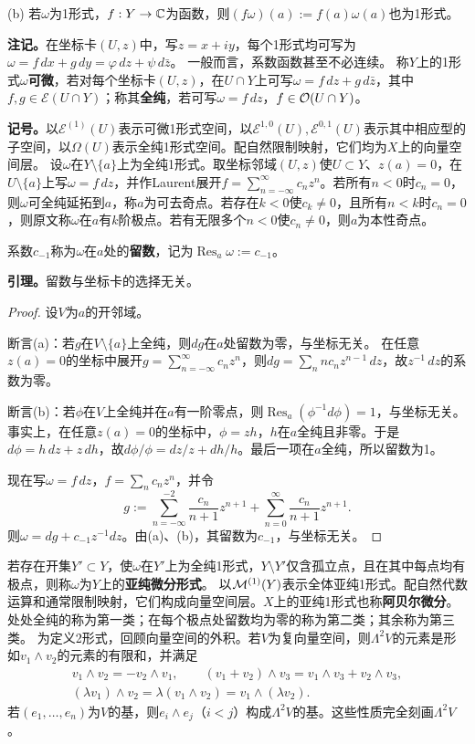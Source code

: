 (b) 若$\omega$为1形式，$f:Y\to\mathbb C$为函数，则$(f\omega)(a):=f(a)\omega(a)$也为1形式。

\textbf{注记。}在坐标卡$(U,z)$中，写$z=x+iy$，每个1形式均可写为$\omega=f\,dx+g\,dy=\varphi\,dz+\psi\,d\bar z$。
一般而言，系数函数甚至不必连续。
称$Y$上的1形式$\omega$\textbf{可微}，若对每个坐标卡$(U,z)$，在$U\cap Y$上可写$\omega=f\,dz+g\,d\bar z$，其中$f,g\in\mathcal E(U\cap Y)$；称其\textbf{全纯}，若可写$\omega=f\,dz$，$f\in\mathcal O(U\cap Y)$。

\textbf{记号。}以$\mathcal E^{(1)}(U)$表示可微1形式空间，以$\mathcal E^{1,0}(U),\mathcal E^{0,1}(U)$表示其中相应型的子空间，以$\Omega(U)$表示全纯1形式空间。配自然限制映射，它们均为$X$上的向量空间层。
设$\omega$在$Y\setminus\{a\}$上为全纯1形式。取坐标邻域$(U,z)$使$U\subset Y$、$z(a)=0$，在$U\setminus\{a\}$上写$\omega=f\,dz$，并作Laurent展开$f=\sum_{n=-\infty}^\infty c_nz^n$。若所有$n<0$时$c_n=0$，则$\omega$可全纯延拓到$a$，称$a$为可去奇点。若存在$k<0$使$c_k\ne0$，且所有$n<k$时$c_n=0$，则原文称$\omega$在$a$有$k$阶极点。若有无限多个$n<0$使$c_n\ne0$，则$a$为本性奇点。

系数$c_{-1}$称为$\omega$在$a$处的\textbf{留数}，记为$\operatorname{Res}_a\omega:=c_{-1}$。

\textbf{引理。}留数与坐标卡的选择无关。
\begin{proof}
设$V$为$a$的开邻域。

断言(a)：若$g$在$V\setminus\{a\}$上全纯，则$dg$在$a$处留数为零，与坐标无关。
在任意$z(a)=0$的坐标中展开$g=\sum_{n=-\infty}^\infty c_nz^n$，则$dg=\sum_n nc_nz^{n-1}\,dz$，故$z^{-1}\,dz$的系数为零。

断言(b)：若$\phi$在$V$上全纯并在$a$有一阶零点，则$\operatorname{Res}_a(\phi^{-1}d\phi)=1$，与坐标无关。事实上，在任意$z(a)=0$的坐标中，$\phi=zh$，$h$在$a$全纯且非零。于是$d\phi=h\,dz+z\,dh$，故$d\phi/\phi=dz/z+dh/h$。最后一项在$a$全纯，所以留数为1。

现在写$\omega=f\,dz$，$f=\sum_n c_nz^n$，并令
\[
g:=\sum_{n=-\infty}^{-2}\frac{c_n}{n+1}z^{n+1}+\sum_{n=0}^\infty\frac{c_n}{n+1}z^{n+1}.
\]
则$\omega=dg+c_{-1}z^{-1}dz$。由(a)、(b)，其留数为$c_{-1}$，与坐标无关。
\end{proof}
若存在开集$Y'\subset Y$，使$\omega$在$Y'$上为全纯1形式，$Y\setminus Y'$仅含孤立点，且在其中每点均有极点，则称$\omega$为$Y$上的\textbf{亚纯微分形式}。
以$\mathcal M^{(1)}(Y)$表示全体亚纯1形式。配自然代数运算和通常限制映射，它们构成向量空间层。$X$上的亚纯1形式也称\textbf{阿贝尔微分}。处处全纯的称为第一类；在每个极点处留数均为零的称为第二类；其余称为第三类。
为定义2形式，回顾向量空间的外积。若$V$为复向量空间，则$\Lambda^2V$的元素是形如$v_1\wedge v_2$的元素的有限和，并满足
\begin{gather*}
v_1\wedge v_2=-v_2\wedge v_1,\qquad
(v_1+v_2)\wedge v_3=v_1\wedge v_3+v_2\wedge v_3,\\
(\lambda v_1)\wedge v_2=\lambda(v_1\wedge v_2)=v_1\wedge(\lambda v_2).
\end{gather*}
若$(e_1,\ldots,e_n)$为$V$的基，则$e_i\wedge e_j$（$i<j$）构成$\Lambda^2V$的基。这些性质完全刻画$\Lambda^2V$。

